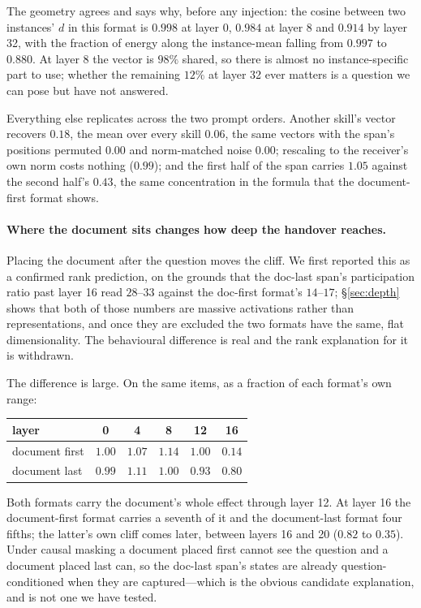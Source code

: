 \documentclass{article}
\newcommand{\dvec}{\ensuremath{d}}
\begin{document}
The geometry agrees and says why, before any injection: the cosine between two
instances' $\dvec$ in this format is $0.998$ at layer 0, $0.984$ at layer 8 and
$0.914$ by layer 32, with the fraction of energy along the instance-mean falling
from $0.997$ to $0.880$. At layer 8 the vector is $98\%$ shared, so there is
almost no instance-specific part to use; whether the remaining $12\%$ at layer 32
ever matters is a question we can pose but have not answered.

Everything else replicates across the two prompt orders. Another skill's vector
recovers $0.18$, the mean over every skill $0.06$, the same vectors with the
span's positions permuted $0.00$ and norm-matched noise $0.00$; rescaling to the
receiver's own norm costs nothing ($0.99$); and the first half of the span
carries $1.05$ against the second half's $0.43$, the same concentration in the
formula that the document-first format shows.



\paragraph{Where the document sits changes how deep the handover reaches.}
Placing the document after the question moves the cliff. We first reported this
as a confirmed rank prediction, on the grounds that the doc-last span's
participation ratio past layer 16 read $28$--$33$ against the doc-first format's
$14$--$17$; \S\ref{sec:depth} shows that both of those numbers are massive
activations rather than representations, and once they are excluded the two
formats have the same, flat dimensionality. The behavioural difference is real
and the rank explanation for it is withdrawn.

The difference is large. On the same items, as a fraction of each format's own
range:
\begin{center}
\begin{tabular}{@{}lccccc@{}}
\toprule
layer & 0 & 4 & 8 & 12 & \textbf{16} \\
\midrule
document first & $1.00$ & $1.07$ & $1.14$ & $1.00$ & $\mathbf{0.14}$ \\
document last  & $0.99$ & $1.11$ & $1.00$ & $0.93$ & $\mathbf{0.80}$ \\
\bottomrule
\end{tabular}
\end{center}

Both formats carry the document's whole effect through layer 12. At layer 16 the
document-first format carries a seventh of it and the document-last format four
fifths; the latter's own cliff comes later, between layers 16 and 20 ($0.82$ to
$0.35$). Under causal masking a document placed first cannot see the question
and a document placed last can, so the doc-last span's states are already
question-conditioned when they are captured---which is the obvious candidate
explanation, and is not one we have tested.
\end{document}
